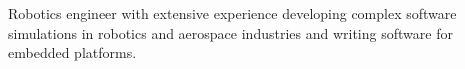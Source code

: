 Robotics engineer with extensive experience developing complex software simulations in robotics and aerospace industries and writing software for embedded platforms.